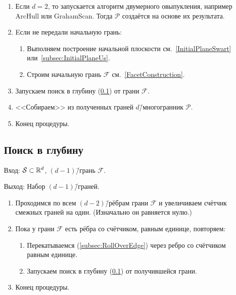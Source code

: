 \documentclass[a4paper,12pt]{article}
\newcommand{\R}[1][]{%
  \ifthenelse{\equal{#1}{}}%
  {\mathbb{R}}%
  {\mathbb{R}^{#1}}}
\newcommand{\Swarm}{\mathcal{S}}              %
\newcommand{\Polytop}{\mathcal{P}}         %
\newcommand{\Facet}{\mathcal{F}}              %
\renewcommand{\.}{\hspace{0.2ex}}
\begin{document}
    \begin{enumerate}

      \item Если $d = 2$, то запускается алгоритм двумерного овыпукления, например ArcHull или GrahamScan. Тогда $\Polytop$ создаётся на основе их результата.

      \item Eсли не передали начальную грань:


      \begin{enumerate}
        \item Выполняем построение начальной плоскости см.~\ref{InitialPlaneSwart} или~\ref{subsec:InitialPlaneUs}.


        \item Строим начальную грань $\Facet$ см.~\ref{FacetConstruction}.
      \end{enumerate}


      \item Запускаем поиск в глубину (\ref{subsec:DFS}) от грани $\Facet$.


      \item <<Собираем>> из полученных граней $d$\=/многогранник $\Polytop$.

      \item Конец процедуры.

    \end{enumerate}

  \subsection{Поиск в глубину}
  \label{subsec:DFS}

    Вход: $\Swarm \subset \R[d]$, $(d-1)$\=/грань $\Facet$.

    Выход: Набор $(d-1)$\=/граней.

    \begin{enumerate}
      \item Проходимся по всем $(d-2)$\=/рёбрам грани $\Facet$ и увеличиваем счётчик смежных граней на один. (Изначально он равняется нулю.)

      \item Пока у грани $\Facet$ есть рёбра со счётчиком, равным единице, повторяем:
      \begin{enumerate}
        \item Перекатываемся (\ref{subsec:RollOverEdge}) через ребро со счётчиком равным единице.


        \item Запускаем поиск в глубину (\ref{subsec:DFS}) от получившейся грани.
      \end{enumerate}

      \item Конец процедуры.

    \end{enumerate}
\end{document}
